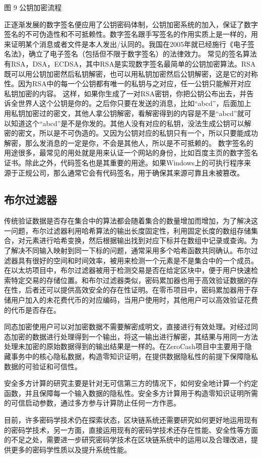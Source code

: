 图 9  公钥加密流程

正逐渐发展的数字签名便应用了公钥密码体制，公钥加密系统的加入，保证了数字签名的不可伪造性和不可抵赖性。数字签名跟手写签名的作用实质上是一样的，用来证明某个消息或者文件是本人发出/认同的。我国在2005年就已经施行《电子签名法》，确立了电子签名（包括但不限于数字签名）的法律效力。
常见的签名算法有RSA，DSA，ECDSA，其中RSA是实现数字签名最简单的公钥加密算法。RSA既可以用公钥加密然后私钥解密，也可以用私钥加密然后公钥解密，这是它的对称性。因为RSA中的每一个公钥都有唯一的私钥与之对应，任一公钥只能解开对应私钥加密的内容。
这样，如果你生成了一对RSA密钥，你把公钥公布出去，并告诉全世界人这个公钥是你的。之后你只要在发送的消息，比如“abcd”，后面加上用私钥加密过的密文，其他人拿公钥解密，看解密得到的内容是不是“abcd”就可以知道这个“abcd”是不是你发的。其他人没有对应的私钥，没法生成公钥可以解密的密文，所以是不可伪造的。又因为公钥对应的私钥只有一个，所以只要能成功解密，那么发消息的一定是你，不会是其他人，所以是不可抵赖的。
数字签名的用途很多，最常见的用处就是用来认证一个网站的身份，比如百度主页的数字签名证书。除此之外，代码签名也是其重要的用途。如果Windows上的可执行程序来源于正规公司，那么通常它会有代码签名，用于确保其来源可靠且未被篡改。
	
\subsection{布尔过滤器}

传统验证数据是否存在集合中的算法都会随着集合的数量增加而增加，为了解决这一问题，布尔过滤器利用哈希算法的输出长度固定性，利用固定长度的数组存储集合，对元素进行哈希变换，然后根据输出找到对应下标并在数组中记录或查询。为了解决不同输入映射到同一下标的问题，通常采用多个哈希函数共同确认。布尔过滤器具有很好的空间和时间效率，被用来检测一个元素是不是集合中的一个成员。在以太坊项目中，布尔过滤器被用于检测交易是否在给定区块中，便于用户快速检索特定交易的存储位置。和布尔过滤器类似，密码累加器也用于高效验证数据的存在性，后者还可以提供高效安全的存在性证明。在零币项目中，密码累加器用于存储用户加入的未花费代币的对应编码，当用户使用时，其他用户可以高效验证花费的代币是否存在。

同态加密使用户可以对加密数据不需要解密成明文，直接进行有效处理。对经过同态加密的数据进行处理得到一个输出，将这一输出进行解密，其结果与用同一方法处理未加密的原始数据得到的输出结果是一样的。在ZeroCash项目中主要用于隐藏事务中的核心隐私数据，构造零知识证明，在提供数据隐私性的前提下保障隐私数据的可验证和可信性。

安全多方计算的研究主要是针对无可信第三方的情况下，如何安全地计算一个约定函数，并且保障每一个输入数据的隐私性。安全多方计算用于构造零知识证明所需的可信启动参数，通过多方参与计算防止任何一方作恶。

目前，许多密码学技术仍在探索状态，区块链系统还需要研究如何更好地运用现有的密码学技术，另一方面，直接运用现有的密码学技术还存在性能、安全性等方面的不足之处，需要进一步研究密码学技术在区块链系统中的运用以及合理改进，提供更多的密码学性质以及提升系统性能。
